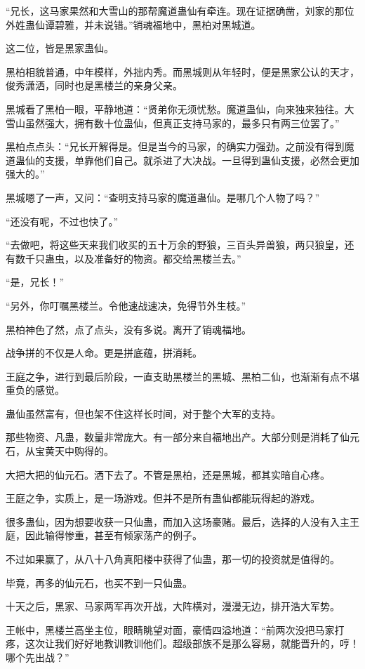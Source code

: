 \begin{this_body}
“兄长，这马家果然和大雪山的那帮魔道蛊仙有牵连。现在证据确凿，刘家的那位外姓蛊仙谭碧雅，并未说错。”销魂福地中，黑柏对黑城道。

这二位，皆是黑家蛊仙。

黑柏相貌普通，中年模样，外拙内秀。而黑城则从年轻时，便是黑家公认的天才，俊秀潇洒，同时也是黑楼兰的亲身父亲。

黑城看了黑柏一眼，平静地道：“贤弟你无须忧愁。魔道蛊仙，向来独来独往。大雪山虽然强大，拥有数十位蛊仙，但真正支持马家的，最多只有两三位罢了。”

黑柏点点头：“兄长开解得是。但是当今的马家，的确实力强劲。之前没有得到魔道蛊仙的支援，单靠他们自己。就杀进了大决战。一旦得到蛊仙支援，必然会更加强大的。”

黑城嗯了一声，又问：“查明支持马家的魔道蛊仙。是哪几个人物了吗？”

“还没有呢，不过也快了。”

“去做吧，将这些天来我们收买的五十万余的野狼，三百头异兽狼，两只狼皇，还有数千只蛊虫，以及准备好的物资。都交给黑楼兰去。”

“是，兄长！”

“另外，你叮嘱黑楼兰。令他速战速决，免得节外生枝。”

黑柏神色了然，点了点头，没有多说。离开了销魂福地。

战争拼的不仅是人命。更是拼底蕴，拼消耗。

王庭之争，进行到最后阶段，一直支助黑楼兰的黑城、黑柏二仙，也渐渐有点不堪重负的感觉。

蛊仙虽然富有，但也架不住这样长时间，对于整个大军的支持。

那些物资、凡蛊，数量非常庞大。有一部分来自福地出产。大部分则是消耗了仙元石，从宝黄天中购得的。

大把大把的仙元石。洒下去了。不管是黑柏，还是黑城，都其实暗自心疼。

王庭之争，实质上，是一场游戏。但并不是所有蛊仙都能玩得起的游戏。

很多蛊仙，因为想要收获一只仙蛊，而加入这场豪赌。最后，选择的人没有入主王庭，因此输得惨重，甚至有倾家荡产的例子。

不过如果赢了，从八十八角真阳楼中获得了仙蛊，那一切的投资就是值得的。

毕竟，再多的仙元石，也买不到一只仙蛊。

十天之后，黑家、马家两军再次开战，大阵横对，漫漫无边，排开浩大军势。

王帐中，黑楼兰高坐主位，眼睛眺望对面，豪情四溢地道：“前两次没把马家打疼，这次让我们好好地教训教训他们。超级部族不是那么容易，就能晋升的，哼！哪个先出战？”


\end{this_body}
